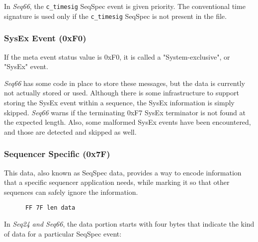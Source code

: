    In \textsl{Seq66},
   the \texttt{c\_timesig} SeqSpec event is given priority.  The
   conventional time signature is used only if the \texttt{c\_timesig}
   SeqSpec is not present in the file.

\subsubsection{SysEx Event (0xF0)}
\label{subsubsec:midi_format_meta_sysex_event}

   If the meta event status value is 0xF0, it is called a "System-exclusive",
   or "SysEx" event.

   \textsl{Seq66} has some code in place to store these messages, but the
   data is currently not actually stored or used.  Although there is some
   infrastructure to support storing the SysEx event within a sequence, the
   SysEx information is simply skipped.  \textsl{Seq66} warns if the
   terminating 0xF7 SysEx terminator is not found at the expected length.
   Also, some malformed SysEx events have been encountered, and those are
   detected and skipped as well.

\subsubsection{Sequencer Specific (0x7F)}
\label{subsubsec:midi_format_meta_sequencer_specific}

   This data, also known as SeqSpec data, provides a way to encode information
   that a specific sequencer application needs, while marking it so that other
   sequences can safely ignore the information.

   \begin{verbatim}
      FF 7F len data
   \end{verbatim}

   In \textsl{Seq24 and Seq66},
   the data portion starts with four bytes
   that indicate the kind of data for a particular SeqSpec event:

